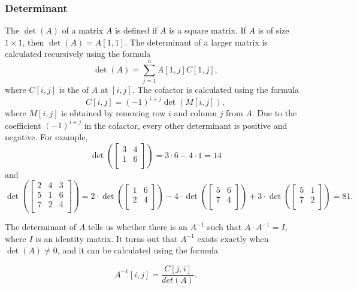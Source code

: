 \subsubsection{Determinant}


The  $\det(A)$ of a matrix $A$
is defined if $A$ is a square matrix.
If $A$ is of size $1 \times 1$,
then $\det(A)=A[1,1]$.
The determinant of a larger matrix is
calculated recursively using the formula 
\[\det(A)=\sum_{j=1}^n A[1,j] C[1,j],\]
where $C[i,j]$ is the  of $A$
at $[i,j]$.
The cofactor is calculated using the formula
\[C[i,j] = (-1)^{i+j} \det(M[i,j]),\]
where $M[i,j]$ is obtained by removing
row $i$ and column $j$ from $A$.
Due to the coefficient $(-1)^{i+j}$ in the cofactor,
every other determinant is positive
and negative.
For example,
\[
\det(
 \begin{bmatrix}
  3 & 4 \\
  1 & 6 \\
 \end{bmatrix}
) = 3 \cdot 6 - 4 \cdot 1 = 14 
\]
and
\[
\det(
 \begin{bmatrix}
  2 & 4 & 3 \\
  5 & 1 & 6 \\
  7 & 2 & 4 \\
 \end{bmatrix}
) = 
2 \cdot
\det(
 \begin{bmatrix}
  1 & 6 \\
  2 & 4 \\
 \end{bmatrix}
)
-4 \cdot
\det(
 \begin{bmatrix}
  5 & 6 \\
  7 & 4 \\
 \end{bmatrix}
)
+3 \cdot
\det(
 \begin{bmatrix}
  5 & 1 \\
  7 & 2 \\
 \end{bmatrix}
) = 81.
\]


The determinant of $A$ tells us
whether there is an 
$A^{-1}$ such that $A \cdot A^{-1} = I$,
where $I$ is an identity matrix.
It turns out that $A^{-1}$ exists
exactly when $\det(A) \neq 0$,
and it can be calculated using the formula

\[A^{-1}[i,j] = \frac{C[j,i]}{det(A)}.\]

